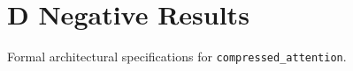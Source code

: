 \section{D Negative Results}

Formal architectural specifications for \texttt{compressed_attention}.
